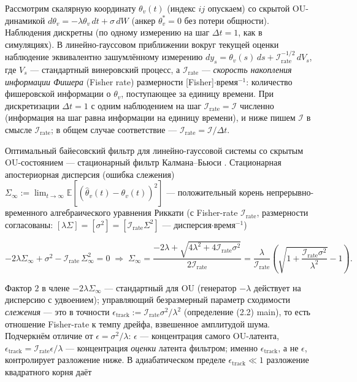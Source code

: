 \documentclass[12pt]{iopart}
\begin{document}
Рассмотрим скалярную координату \(\theta_v(t)\) (индекс \(ij\) опускаем) со скрытой OU-динамикой \(d\theta_v = -\lambda\theta_v\,dt + \sigma\,dW\) (анкер \(\theta_v^* = 0\) без потери общности). Наблюдения дискретны (по одному измерению на шаг \(\Delta t = 1\), как в симуляциях). В линейно-гауссовом приближении вокруг текущей оценки наблюдение эквивалентно зашумлённому измерению \(dy_s = \theta_v(s)\,ds + \mathcal I_{\text{rate}}^{-1/2}\,dV_s\), где \(V_s\) --- стандартный винеровский процесс, а \(\mathcal I_{\text{rate}}\) --- \emph{скорость накопления информации Фишера} (Fisher rate) размерности {[}Fisher{]}\(\cdot\)время\(^{-1}\): количество фишеровской информации о \(\theta_v\), поступающее за единицу времени. При дискретизации \(\Delta t = 1\) с одним наблюдением на шаг \(\mathcal I_{\text{rate}} = \mathcal I\) численно (информация на шаг равна информации на единицу времени), и ниже пишем \(\mathcal I\) в смысле \(\mathcal I_{\text{rate}}\); в общем случае соответствие --- \(\mathcal I_{\text{rate}} = \mathcal I/\Delta t\).



Оптимальный байесовский фильтр для линейно-гауссовой системы со скрытым OU-состоянием --- стационарный фильтр Калмана--Бьюси \cite{KalmanBucy1961,AndersonMoore1979}. Стационарная апостериорная дисперсия (ошибка слежения) \(\Sigma_\infty := \lim_{t\to\infty}\mathbb{E}[(\hat\theta_v(t)-\theta_v(t))^2]\) --- положительный корень непрерывно-временного алгебраического уравнения Риккати (с Fisher-rate \(\mathcal I_{\text{rate}}\), размерности согласованы: \([\lambda\Sigma] = [\sigma^2] = [\mathcal I_{\text{rate}}\Sigma^2]\) --- дисперсия\(\cdot\)время\(^{-1}\))



\begin{equation}-2\lambda\Sigma_\infty + \sigma^2 - \mathcal I_{\text{rate}}\,\Sigma_\infty^2 = 0 \;\Longrightarrow\; \Sigma_\infty = \frac{-2\lambda + \sqrt{4\lambda^2 + 4\mathcal I_{\text{rate}}\sigma^2}}{2\mathcal I_{\text{rate}}} = \frac{\lambda}{\mathcal I_{\text{rate}}}\left(\sqrt{1 + \frac{\mathcal I_{\text{rate}}\sigma^2}{\lambda^2}} - 1\right). \tag{S1.2}\end{equation}



Фактор \(2\) в члене \(-2\lambda\Sigma_\infty\) --- стандартный для OU (генератор \(-\lambda\) действует на дисперсию с удвоением); управляющий безразмерный параметр сходимости \emph{слежения} --- это в точности \(\epsilon_{\text{track}} := \mathcal I_{\text{rate}}\sigma^2/\lambda^2\) (определение (2.2) main), то есть отношение Fisher-rate к темпу дрейфа, взвешенное амплитудой шума. Подчеркнём отличие от \(\epsilon = \sigma^2/\lambda\): \(\epsilon\) --- концентрация самого OU-латента, \(\epsilon_{\text{track}} = \mathcal I_{\text{rate}}\epsilon/\lambda\) --- концентрация \emph{оценки} латента фильтром; именно \(\epsilon_{\text{track}}\), а не \(\epsilon\), контролирует разложение ниже. В адиабатическом пределе \(\epsilon_{\text{track}} \ll 1\) разложение квадратного корня даёт
\end{document}
